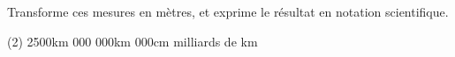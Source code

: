 %
%
Transforme ces mesures en mètres, et exprime le résultat en notation scientifique.
	\begin{tasks}(2)
		\task 2500km
		\task 13cm
		\task 3mm
		 000 000km
		 000cm
		 milliards de km
	\end{tasks}
